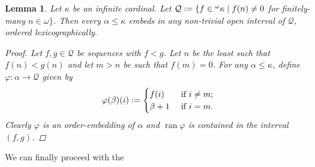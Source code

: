 \documentclass[11pt,a4paper]{report}
\newtheorem{lemma}[theorem]{Lemma}
\theoremstyle{definition}
\theoremstyle{num.custom-title}
\theoremstyle{custom-title}
\DeclareMathOperator{\ran}{ran}
\newcommand{\Q}{\mathbb{Q}}
\newcommand*{\defeq}{\mathrel{\rlap{%
                     \raisebox{0.3ex}{$\cdot$}}%
                     \raisebox{-0.3ex}{$\cdot$}}%
                     =}
\renewcommand{\phi}{\varphi}
\begin{document}
\begin{lemma}\label{lemma-embedding_in_finite_sequences}
\renewcommand{\Q}{\mathcal{Q}}
Let $\kappa$ be an infinite cardinal. Let $\Q \defeq \{f \in {}^\omega \kappa \mid f(n) \neq 0$ for finitely-many $n \in \omega \}$. Then every $\alpha \leq \kappa$ embeds in any non-trivial open interval of $\Q$, ordered lexicographically.
\begin{proof}
Let $f,g \in \Q$ be sequences with $f<g$. Let $n$ be the least such that $f(n)<g(n)$ and let $m>n$ be such that $f(m)=0$. For any $\alpha \leq \kappa$, define $\phi \colon \alpha \to \Q$ given by
\[
\phi(\beta)(i) \defeq
\begin{cases}
f(i) & \text{ if $i \neq m$;}\\
\beta+1 & \text{ if $i = m$}.
\end{cases}
\]
Clearly $\phi$ is an order-embedding of $\alpha$ and $\ran \phi$ is contained in the interval $(f,g)$.
\end{proof}
\end{lemma}

We can finally proceed with the
\end{document}
